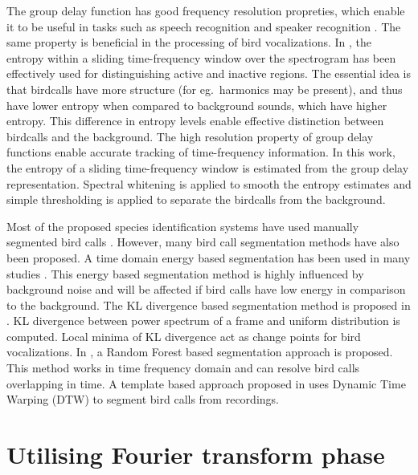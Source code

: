 \documentclass[a4paper]{article}
\begin{document}
The group delay function has good frequency resolution propreties, which enable
it to be useful in tasks such as speech recognition and speaker recognition
\cite{hema,padman}. The same property is beneficial in the processing of bird
vocalizations. In \cite{wang2013}, the entropy within a sliding time-frequency
window over the spectrogram has been effectively used for distinguishing active
and inactive regions. The essential idea is that birdcalls have more structure
(for eg.~harmonics may be present), and thus have lower entropy when compared to
 background sounds, which have higher entropy. This difference in entropy
levels enable effective distinction between birdcalls and the background.
The high resolution property of group delay functions enable accurate tracking
of time-frequency information. In this work, the entropy of a sliding
time-frequency window is estimated from the group delay representation. Spectral
whitening is applied to smooth the entropy estimates and simple thresholding is
applied to separate the birdcalls from the background.

Most of the proposed species identification systems have used manually segmented bird calls \cite{Trifa} \cite{Lee}. However, many bird call segmentation methods have also been proposed. A time domain energy based segmentation has been used in many studies \cite{Harma} \cite{Somervuo} \cite{Fagerlund}. This energy  based segmentation method is highly influenced by background noise and will be affected if bird calls have low energy in comparison to the background. The KL divergence based segmentation method   is proposed in \cite{Lakshmi}.  KL divergence between power spectrum of a frame and uniform distribution is computed. Local minima of KL divergence act as change points for bird vocalizations. In \cite{Neal} , a Random Forest based segmentation approach is proposed. This method works in time frequency domain and can resolve bird calls overlapping in time. A template based  approach proposed in \cite{Kaewtip} uses Dynamic Time Warping (DTW) to segment bird calls from recordings.





\section{Utilising Fourier transform phase}
\end{document}
